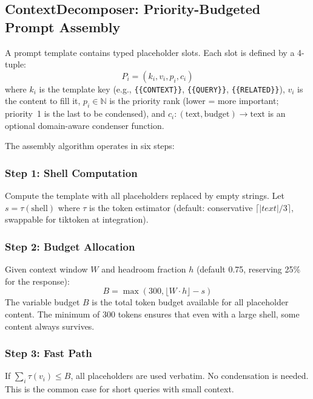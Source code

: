 \documentclass[11pt]{article}
\newcommand{\eg}{e.g.}
\begin{document}
\subsection{ContextDecomposer: Priority-Budgeted Prompt Assembly}
\label{sec:decomposer}

A prompt template contains typed placeholder slots.  Each slot is
defined by a 4-tuple:
\begin{equation}
P_i = (k_i, v_i, p_i, c_i)
\label{eq:placeholder}
\end{equation}
where $k_i$ is the template key (\eg, \texttt{\{\{CONTEXT\}\}},
\texttt{\{\{QUERY\}\}}, \texttt{\{\{RELATED\}\}}), $v_i$ is the
content to fill it, $p_i \in \mathbb{N}$ is the priority rank
(lower = more important; priority~1 is the last to be condensed),
and $c_i: (\text{text}, \text{budget}) \to \text{text}$ is an
optional domain-aware condenser function.

The assembly algorithm operates in six steps:

\subsubsection{Step 1: Shell Computation}

Compute the template with all placeholders replaced by empty strings.
Let $s = \tau(\text{shell})$ where $\tau$ is the token estimator
(default: conservative $\lceil |text| / 3 \rceil$, swappable for
tiktoken at integration).

\subsubsection{Step 2: Budget Allocation}

Given context window $W$ and headroom fraction $h$ (default 0.75,
reserving 25\% for the response):
\begin{equation}
B = \max\!\left(300, \lfloor W \cdot h \rfloor - s\right)
\label{eq:budget}
\end{equation}
The variable budget $B$ is the total token budget available for all
placeholder content.  The minimum of 300 tokens ensures that even
with a large shell, some content always survives.

\subsubsection{Step 3: Fast Path}

If $\sum_i \tau(v_i) \leq B$, all placeholders are used verbatim.
No condensation is needed.  This is the common case for short queries
with small context.
\end{document}
